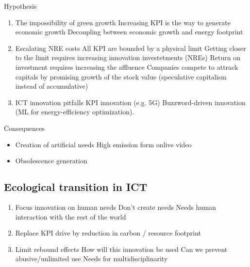 \bigbreak
Hypothesis
\begin{enumerate}
  \item The impossibility of green growth
    \subitem Increasing KPI is the way to generate economic growth
    \subitem Decoupling between economic growth and energy footprint
  \item Escalating NRE costs
    \subitem All KPI are bounded by a physical limit
    \subitem Getting closer to the limit requires increasing innovation investetments (NREs)
    \subitem Return on investment requires increasing the affluence
    \subitem Companies compete to attrack capitals by promising growth of the stock value (speculative capitalism instead of accumulative)
  \item ICT innovation pitfalls
    \subitem KPI innovation (e.g. 5G)
    \subitem Buzzword-driven innovation (ML for energy-efficiency optimization).
\end{enumerate}


Consequences
\begin{itemize}
  \item Creation of artificial needs
  \subitem High emission form onlive video
  \item Obsolescence generation
\end{itemize}



\subsection{Ecological transition in ICT}
\begin{enumerate}
  \item Focus innovation on human needs
    \subitem Don't create needs
    \subitem Needs human interaction with the rest of the world
  \item Replace KPI drive by reduction in carbon / resource footprint
  \item Limit rebound effects
    \subitem How will this innovation be used
    \subitem Can we prevent abusive/unlimited use 
    \subitem Needs for multidisciplinarity
\end{enumerate}




